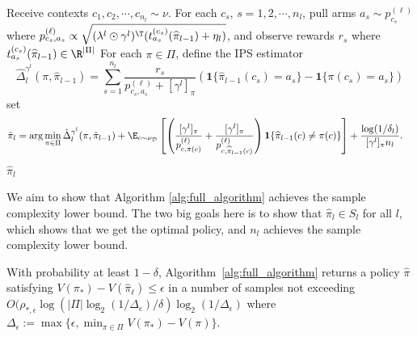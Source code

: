 \documentclass{article}
\newcommand{\pill}{\widehat{\pi}_{l-1}}
\newcommand{\1}{\mathbf{1}}
\begin{document}
\begin{algorithm}[!htb]
\begin{algorithmic}[1]
\STATE Receive contexts $c_1,c_2,\cdots,c_{n_l}\sim\nu$. 
\STATE For each $c_s$, $s=1,2,\cdots,n_l$, pull arms $a_s\sim p^{(\ell)}_{c_s}$ where $p^{(\ell)}_{c_s,a_s}\propto \sqrt{(\lambda^{l}\odot\gamma^l)^\T (t_{a_s}^{(c_s)}(\pill)+\eta_l)}$, and observe rewards $r_s$ where $t_{a_s}^{(c_s)}(\pill)\in\R^{|\Pi|}$
\STATE For each $\pi\in\Pi$, define the IPS estimator $$\hat{\Delta}_l^{\gamma^l}(\pi,\pill)=\sum_{s=1}^{n_l}\frac{r_s}{p^{(\ell)}_{c_s,a_s}+[\gamma^l]_\pi}(\1\{\pill(c_s)=a_s\}-\1\{\pi(c_s)=a_s\})$$
\STATE set 
\begin{align}
    \hat{\pi}_l
    &=\arg\min_{\pi\in\Pi}\hat{\Delta}_l^{\gamma^l}(\pi,\hat{\pi}_{l-1})+\E_{c\sim\nu_{\mathcal{D}}} \left[ \left(\frac{[\gamma^l]_\pi}{p_{c,\pi(c)}^{(\ell)}}+\frac{[\gamma^l]_\pi}{p_{c,\pill(c)}^{(\ell)}}\right) \1\{\pill(c )\ne \pi(c )\} \right]+\frac{\log(1/\delta_l)}{[\gamma^l]_\pi n_l}.
\end{align}
\ENDFOR
\ENSURE $\hat{\pi}_l$
\end{algorithmic}
\end{algorithm}
We aim to show that Algorithm \ref{alg:full_algorithm} achieves the sample complexity lower bound. The two big goals here is to show that $\hat{\pi}_l\in S_l$ for all $l$, which shows that we get the optimal policy, and $n_l$ achieves the sample complexity lower bound. 
\begin{theorem}
With probability at least $1-\delta$, Algorithm~\ref{alg:full_algorithm} returns a policy $\hat{\pi}$ satisfying $V(\pi_{\ast}) - V(\hat{\pi}_{\ell})\leq \epsilon$ in a number of samples not exceeding $O(\rho_{\ast, \epsilon}\log(|\Pi|\log_2(1/\Delta_\epsilon)/\delta)\log_2(1/\Delta_{\epsilon})$ where $\Delta_{\epsilon} := \max\{\epsilon, \min_{\pi\in \Pi} V(\pi_{\ast}) - V(\pi)\}$.
\end{theorem}
\end{document}

